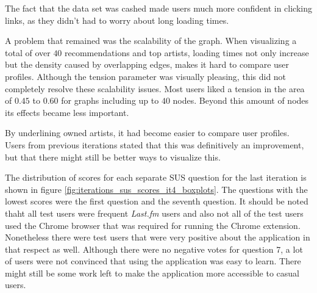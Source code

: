 The fact that the data set was cashed made users much more confident in clicking links, as they didn't had to worry about long loading times.

A problem that remained was the scalability of the graph. When visualizing a total of over $40$ recommendations and top artists, loading times not only increase but the density caused by overlapping edges, makes it hard to compare user profiles. Although the tension parameter was visually pleasing, this did not completely resolve these scalability issues. Most users liked a tension in the area of $0.45$ to $0.60$ for graphs including up to $40$ nodes. Beyond this amount of nodes its effects became less important.

By underlining owned artists, it had become easier to compare user profiles. Users from previous iterations stated that this was definitively an improvement, but that there might still be better ways to visualize this. %

The distribution of scores for each separate SUS question for the last iteration is shown in figure \ref{fig:iterations_sus_scores_it4_boxplots}. The questions with the lowest scores were the first question and the seventh question. It should be noted thaht all test users were frequent \emph{Last.fm} users and also not all of the test users used the Chrome browser that was required for running the Chrome extension. Nonetheless there were test users that were very positive about the application in that respect as well. Although there were no negative votes for question 7, a lot of users were not convinced that using the application was easy to learn. There might still be some work left to make the application more accessible to casual users.










